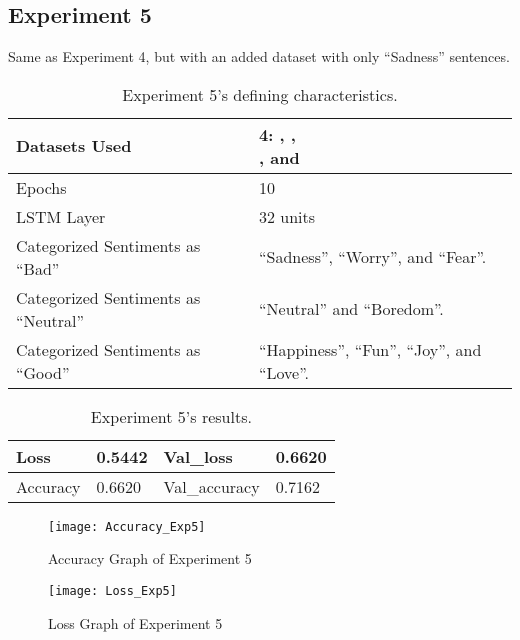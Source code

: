 \subsection{Experiment 5}
Same as Experiment 4, but with an added dataset with only ``Sadness'' sentences.
\begin{table}[!h]
	\caption{Experiment 5's defining characteristics.}
	\vspace{0.5cm}
	\centering
	\begin{tabular}[t]{|l|l|}
	\hline
		Datasets Used & \makecell{4: \citet{d1}, \citet{d2},\\ \citet{d3}, and \citet{d4}}
	\\ \hline
		Epochs & 10
	\\ \hline
		LSTM Layer & 32 units
	\\ \hline
		Categorized Sentiments as ``Bad'' & ``Sadness'', ``Worry'', and ``Fear''.
	\\ \hline	
		 Categorized Sentiments as ``Neutral'' & ``Neutral'' and ``Boredom''.
	\\ \hline	
		Categorized Sentiments as ``Good'' & ``Happiness'', ``Fun'', ``Joy'', and ``Love''.
	\\ \hline
	\end{tabular}
\end{table}

\begin{table}[!b]
	\caption{Experiment 5's results.}
	\vspace{0.5cm}
	\centering
	\begin{tabular}[t]{|l|l|l|l|}
	\hline
		Loss & 0.5442 & Val\_loss & 0.6620
	\\ \hline
		Accuracy & 0.6620 & Val\_accuracy & 0.7162
	\\ \hline
	\end{tabular}
\end{table}


\begin{figure}[!h]
	\centering
	\texttt{[image: Accuracy\_Exp5]}
	\caption{Accuracy Graph of Experiment 5}
	\label{fig:accuracy_exp5}
	\texttt{[image: Loss\_Exp5]}
	\caption{Loss Graph of Experiment 5}
	\label{fig:loss_exp5}
\end{figure}
\pagebreak

